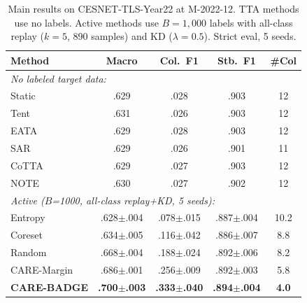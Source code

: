 \documentclass[journal]{IEEEtran}
\newcommand{\ours}{CARE}  %
\begin{document}
\begin{table}[t]
\centering
\caption{Main results on CESNET-TLS-Year22 at M-2022-12. TTA methods use no labels. Active methods use $B{=}1{,}000$ labels with all-class replay ($k{=}5$, 890 samples) and KD ($\lambda{=}0.5$). Strict eval, 5 seeds.}
\label{tab:main_results}
\scriptsize
\setlength{\tabcolsep}{3pt}
\begin{tabular}{@{}l cccc@{}}
\toprule
Method & Macro & Col.\ F1 & Stb.\ F1 & \#Col \\
\midrule
\multicolumn{5}{l}{\textit{No labeled target data:}} \\
Static          & .629 & .028 & .903 & 12 \\
Tent            & .631 & .026 & .903 & 12 \\
EATA            & .629 & .028 & .903 & 12 \\
SAR             & .629 & .026 & .901 & 11 \\
CoTTA           & .629 & .027 & .903 & 12 \\
NOTE            & .630 & .027 & .902 & 12 \\
\midrule
\multicolumn{5}{l}{\textit{Active ($B$=1000, all-class replay+KD, 5 seeds):}} \\
Entropy         & .628$\pm$.004 & .078$\pm$.015 & .887$\pm$.004 & 10.2 \\
Coreset         & .634$\pm$.005 & .116$\pm$.042 & .886$\pm$.007 & 8.8 \\
Random          & .668$\pm$.004 & .188$\pm$.024 & .892$\pm$.006 & 8.2 \\
\ours{}-Margin  & .686$\pm$.001 & .256$\pm$.009 & .892$\pm$.003 & 5.8 \\
\textbf{\ours{}-BADGE} & \textbf{.700$\pm$.003} & \textbf{.333$\pm$.040} & \textbf{.894$\pm$.004} & \textbf{4.0} \\
\bottomrule
\end{tabular}
\end{table}
\end{document}
